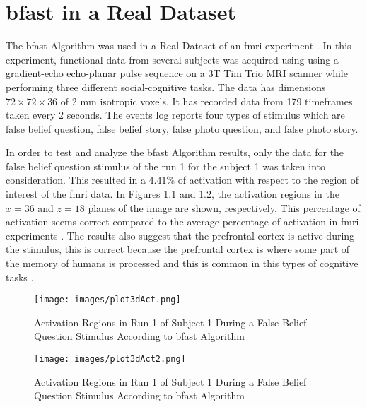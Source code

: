 \chapter{\texorpdfstring{\gls{bfast}}{BFAST} in a Real Dataset}

The \gls{bfast} Algorithm was used in a Real Dataset of an \gls{fmri} experiment \cite{moran2012social}. 
In this experiment, functional data from several subjects was acquired using using a
gradient-echo echo-planar pulse sequence on a 3T Tim Trio MRI scanner while performing three different 
social-cognitive tasks. The data has dimensions $72\times72\times36$ of 2 mm isotropic voxels. It has 
recorded data from 179 timeframes taken every 2 seconds. The events log reports four types of stimulus 
which are false belief question, false belief story, false photo question, and false photo story.

In order to test and analyze the \gls{bfast} Algorithm results, only 
the data for the false belief question stimulus of the run 1 for the subject 1 was taken into 
consideration. This resulted in a $4.41\%$ of activation with respect to the region of interest 
of the \gls{fmri} data. In Figures \ref{fig:realDataYZ} and \ref{fig:realDataXY}, 
the activation regions in the $x=36$ and $z=18$ planes of the image are shown, respectively. 
This percentage of activation seems correct compared to the average percentage of activation in
\gls{fmri} experiments \cite{lazar2008statistical}. The results also suggest that the prefrontal 
cortex is active during the stimulus, this is correct because the prefrontal cortex is where some
part of the memory of humans is processed and this is common in this types of cognitive 
tasks \cite{amin2012brain}. 

\begin{figure}[htbp!]
\centering
\texttt{[image: images/plot3dAct.png]}
\caption{Activation Regions in Run 1 of Subject 1 During a False Belief Question Stimulus According to \gls{bfast} Algorithm}
\label{fig:realDataYZ}
\end{figure}

\begin{figure}[htbp!]
\centering
\texttt{[image: images/plot3dAct2.png]}
\caption{Activation Regions in Run 1 of Subject 1 During a False Belief Question Stimulus According to \gls{bfast} Algorithm}
\label{fig:realDataXY}
\end{figure}